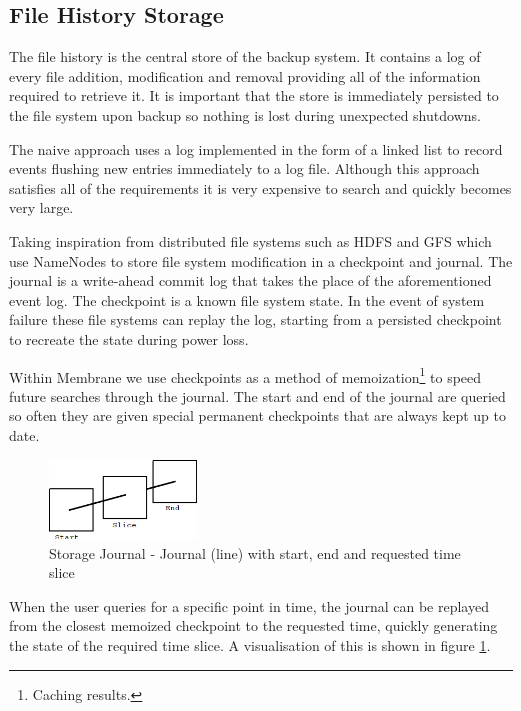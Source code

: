 \documentclass[11pt, a4paper, twoside]{report}
\begin{document}
\subsection{File History Storage}

The file history is the central store of the backup system. It contains a log of every file addition, modification and removal providing all of the information required to retrieve it. It is important that the store is immediately persisted to the file system upon backup so nothing is lost during unexpected shutdowns.

The naive approach uses a log implemented in the form of a linked list to record events flushing new entries immediately to a log file. Although this approach satisfies all of the requirements it is very expensive to search and quickly becomes very large.

Taking inspiration from distributed file systems such as HDFS \citep{hdfsAnalysis} and GFS \citep{mckusick2010gfs} which use NameNodes to store file system modification in a checkpoint and journal. The journal is a write-ahead commit log that takes the place of the aforementioned event log. The checkpoint is a known file system state. In the event of system failure these file systems can replay the log, starting from a persisted checkpoint to recreate the state during power loss.

Within Membrane we use checkpoints as a method of memoization\footnote{Caching results.} to speed future searches through the journal. The start and end of the journal are queried so often they are given special permanent checkpoints that are always kept up to date.

\begin{figure}
 \centering
 \includegraphics[width=0.35\textwidth]{journal}
 \caption{Storage Journal - Journal (line) with start, end and requested time slice}
 \label{fig:journal}
\end{figure}

When the user queries for a specific point in time, the journal can be replayed from the closest memoized checkpoint to the requested time, quickly generating the state of the required time slice. A visualisation of this is shown in figure \ref{fig:journal}.
\end{document}

